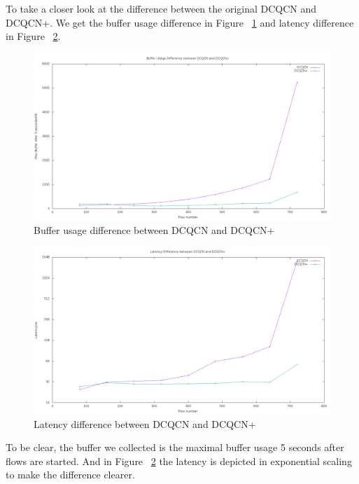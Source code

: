 \documentclass[12pt,a4paper]{article}
\begin{document}
To take a closer look at the difference between the original DCQCN and DCQCN+.
We get the buffer usage difference in Figure ~\ref{fig:buffer} and latency difference in Figure ~\ref{fig:latency}.

\begin{figure}[ht]
	\begin{center}
		\includegraphics[width=6in]{buffer}
		\caption{Buffer usage difference between DCQCN and DCQCN+}
		\label{fig:buffer}
	\end{center}
\end{figure}

\begin{figure}[ht]
	\begin{center}
		\includegraphics[width=6in]{latency}
		\caption{Latency difference between DCQCN and DCQCN+}
		\label{fig:latency}
	\end{center}
\end{figure}

To be clear, the buffer we collected is the maximal buffer usage 5 seconds after flows are started.
And in Figure ~\ref{fig:latency} the latency is depicted in exponential scaling to make the difference clearer.
\end{document}
